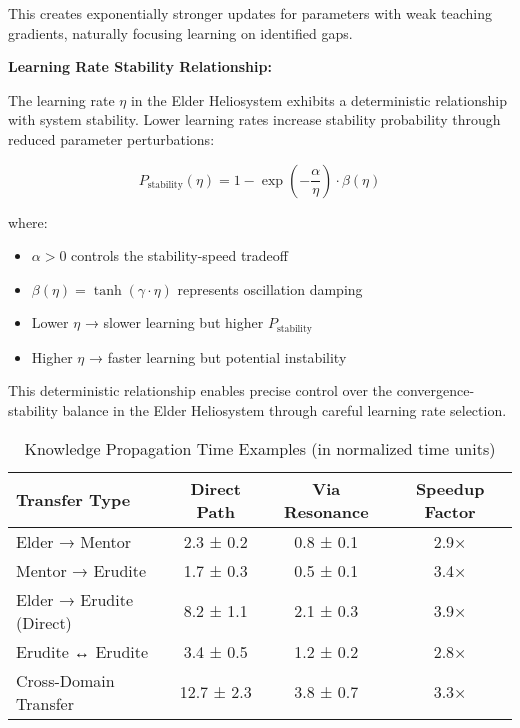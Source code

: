 This creates exponentially stronger updates for parameters with weak teaching gradients, naturally focusing learning on identified gaps.

\textbf{Learning Rate Stability Relationship:}

The learning rate $\eta$ in the Elder Heliosystem exhibits a deterministic relationship with system stability. Lower learning rates increase stability probability through reduced parameter perturbations:

\begin{equation}
P_{\text{stability}}(\eta) = 1 - \exp\left(-\frac{\alpha}{\eta}\right) \cdot \beta(\eta)
\end{equation}

where:
\begin{itemize}
    \item $\alpha > 0$ controls the stability-speed tradeoff
    \item $\beta(\eta) = \tanh(\gamma \cdot \eta)$ represents oscillation damping
    \item Lower $\eta$ → slower learning but higher $P_{\text{stability}}$
    \item Higher $\eta$ → faster learning but potential instability
\end{itemize}

This deterministic relationship enables precise control over the convergence-stability balance in the Elder Heliosystem through careful learning rate selection.

\begin{table}[h]
\centering
\caption{Knowledge Propagation Time Examples (in normalized time units)}
\begin{tabular}{|l|c|c|c|}
\hline
\textbf{Transfer Type} & \textbf{Direct Path} & \textbf{Via Resonance} & \textbf{Speedup Factor} \\
\hline
Elder → Mentor & 2.3 ± 0.2 & 0.8 ± 0.1 & 2.9× \\
Mentor → Erudite & 1.7 ± 0.3 & 0.5 ± 0.1 & 3.4× \\
Elder → Erudite (Direct) & 8.2 ± 1.1 & 2.1 ± 0.3 & 3.9× \\
Erudite ↔ Erudite & 3.4 ± 0.5 & 1.2 ± 0.2 & 2.8× \\
Cross-Domain Transfer & 12.7 ± 2.3 & 3.8 ± 0.7 & 3.3× \\
\hline
\end{tabular}
\end{table}

